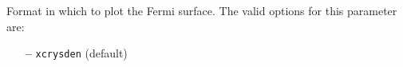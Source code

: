 Format in which to plot the Fermi surface. 
The valid options for this parameter are:
\begin{itemize}
\item[{\bf --}] \verb#xcrysden#  (default)
\end{itemize}


%




%
%
%
%
%
%
%
%
%
%
%
%




